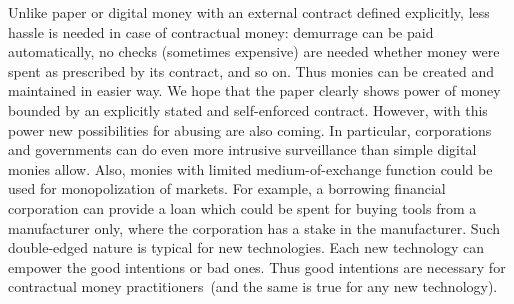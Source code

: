 \documentclass[]{llncs}   %
\begin{document}
Unlike paper or digital money with an external contract defined explicitly, less hassle is needed in case of contractual money: demurrage can be paid automatically, no checks (sometimes expensive) are needed whether money were spent as prescribed
by its contract, and so on. Thus monies can be created and maintained in easier way. We hope that the paper clearly shows power of money bounded by an explicitly stated and self-enforced contract. However, with this power new possibilities for abusing are also coming. In particular, corporations and governments can do even more intrusive surveillance than simple digital monies allow.  Also, monies with limited medium-of-exchange function could be used for monopolization of markets. For example, a borrowing financial corporation can provide a loan which could be spent for buying tools from a manufacturer only, where the corporation has a stake in the manufacturer. Such double-edged nature is typical for new technologies. Each new technology can empower the good intentions or bad ones. Thus good intentions are necessary for contractual money practitioners~(and the same is true for any new technology).



\end{document}
